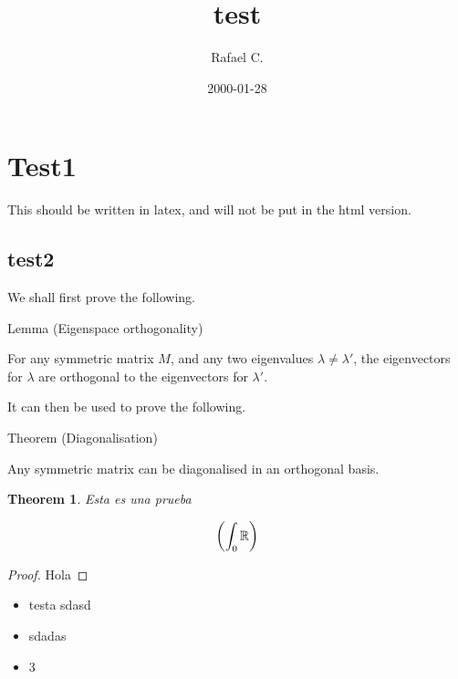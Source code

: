 \documentclass[10pt,
 article,
 amsmath,amssymb
]{revtex4-2}
\newtheorem{theorem}{Theorem}[section]
\begin{document}
\title{test}



\author{Rafael C.}




\date{2000-01-28}







\maketitle

\tableofcontents



\section{Test1}


This should be written in latex, and will not be put in the html version.

\subsection{test2}


We shall first prove the following.

Lemma (Eigenspace orthogonality)

For any symmetric matrix $M$, and any two eigenvalues $\lambda \ne \lambda'$, the eigenvectors for $\lambda$ are orthogonal to the eigenvectors for $\lambda'$.


It can then be used to prove the following.

Theorem (Diagonalisation)

Any symmetric matrix can be diagonalised in an orthogonal basis.


\begin{theorem}
Esta es una prueba  

$$\qty(\int_0 \mathbb{R}) $$
\end{theorem}

\begin{proof}
Hola
\end{proof}

\begin{itemize}
\item testa sdasd
\item sdadas
\item 3
\end{itemize}
\end{document}
